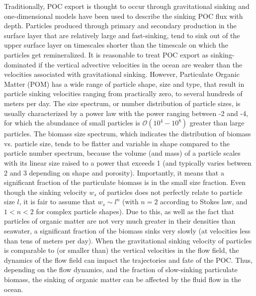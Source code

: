 \documentclass[article,linenumbers]{agujournal2018}
\begin{document}
Traditionally, POC export is thought to occur through gravitational sinking and one-dimensional models have been used to describe the sinking POC flux with depth. Particles produced through primary and secondary production in the surface layer that are relatively large and fast-sinking, tend to sink out of the upper surface layer on timescales shorter than the timescale on which the particles get remineralized. It is reasonable to treat POC export as sinking-dominated if the vertical advective velocities in the ocean are weaker than the velocities associated with gravitational sinking. However, Particulate Organic Matter (POM) has a wide range of particle shape, size and type, that result in particle sinking velocities ranging from practically zero, to several hundreds of meters per day. The size spectrum, or number distribution of particle sizes, is usually characterized by a power law with the power ranging between -2 and -4, for which the abundance of small particles is $\mathcal{O}(10^4 - 10^8)$ greater than large particles. The biomass size spectrum, which indicates the distribution of biomass vs. particle size, tends to be flatter and variable in shape \citep{Sheldon_1972} compared to the particle number spectrum, because the volume (and mass) of a particle scales with its linear size raised to a power that exceeds 1 (and typically varies between 2 and 3 depending on shape and porosity).  Importantly, it means that a significant fraction of the particulate biomass is in the small size fraction. Even though the sinking velocity $w_s$ of particles does not perfectly relate to particle size $l$, it is fair to assume  that  $w_s \sim l^n$ (with $n=2$ according to Stokes law, and $1<n<2$ for complex particle shapes). Due to this, as well as the fact that particles of organic matter are not very much greater in their densities than seawater, a significant fraction of the biomass sinks very slowly (at velocities less than tens of meters per day).  When the gravitational sinking velocity of particles is comparable to (or smaller than) the vertical velocities in the flow field, the dynamics of the flow field can impact the trajectories and fate of the POC.  Thus, depending on the flow dynamics, and the fraction of slow-sinking particulate biomass, the sinking of organic matter can be affected by the fluid flow in the ocean.
\end{document}
